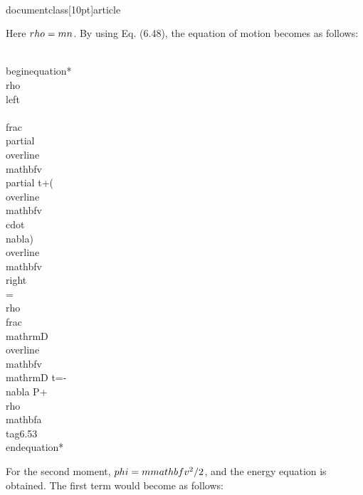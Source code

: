 \\documentclass[10pt]{article}
\begin{document}
{{{{Here $\\rho=m n$. By using Eq. (6.48), the equation of motion becomes as follows:


\\begin{equation*}
\\rho\\left\\{\\frac{\\partial \\overline{\\mathbf{v}}}{\\partial t}+(\\overline{\\mathbf{v}} \\cdot \\nabla) \\overline{\\mathbf{v}}\\right\\}=\\rho \\frac{\\mathrm{D} \\overline{\\mathbf{v}}}{\\mathrm{D} t}=-\\nabla P+\\rho \\mathbf{a} \\tag{6.53}
\\end{equation*}


For the second moment, $\\phi=m \\mathbf{v}^{2} / 2$, and the energy equation is obtained. The first term would become as follows:


}}}}
\end{document}
